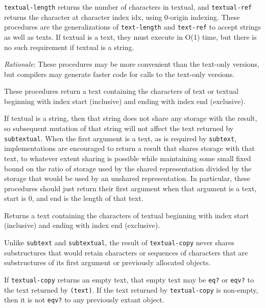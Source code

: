 \begin{entry}{%
  }
  
  \texttt{textual-length} returns the number of characters in textual,
  and \texttt{textual-ref} returns the character at character index
  idx, using 0-origin indexing. These procedures are the
  generalizations of \texttt{text-length} and \texttt{text-ref} to
  accept strings as well as texts. If textual is a text, they must
  execute in O(1) time, but there is no such requirement if textual is
  a string.

  \emph{Rationale}: These procedures may be more convenient than the
  text-only versions, but compilers may generate faster code for calls
  to the text-only versions.
\end{entry}

\begin{entry}{%
  }

  These procedures
  return a text containing the characters of text or textual beginning
  with index start (inclusive) and ending with index end (exclusive).

  If textual is a string, then that string does not share any storage
  with the result, so subsequent mutation of that string will not
  affect the text returned by \texttt{subtextual}. When the first
  argument is a text, as is required by \texttt{subtext},
  implementations are encouraged to return a result that shares
  storage with that text, to whatever extent sharing is possible while
  maintaining some small fixed bound on the ratio of storage used by
  the shared representation divided by the storage that would be used
  by an unshared representation. In particular, these procedures
  should just return their first argument when that argument is a
  text, start is 0, and end is the length of that text.
\end{entry}

\begin{entry}{%
  }
  
  Returns a text containing the characters of textual beginning with
  index start (inclusive) and ending with index end (exclusive).

  Unlike \texttt{subtext} and \texttt{subtextual}, the result of
  \texttt{textual-copy} never shares substructures that would retain
  characters or sequences of characters that are substructures of its
  first argument or previously allocated objects.

  If \texttt{textual-copy} returns an empty text, that empty text may
  be \texttt{eq?} or \texttt{eqv?} to the text returned by
  \texttt{(text)}.  If the text returned by \texttt{textual-copy} is
  non-empty, then it is not \texttt{eqv?} to any previously extant
  object.
\end{entry}

